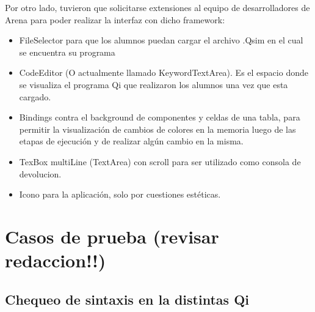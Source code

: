 Por otro lado, tuvieron que solicitarse extensiones al equipo de desarrolladores de Arena para poder realizar la interfaz con dicho framework:

\begin{itemize}
\item FileSelector para que los alumnos puedan cargar el archivo .Qsim en el cual se encuentra su programa
\item CodeEditor (O actualmente llamado KeywordTextArea). Es el espacio donde se visualiza el programa Qi que realizaron los alumnos una vez que esta cargado.
\item Bindings contra el background de componentes y celdas de una tabla, para permitir la visualización de cambios de colores en la memoria luego de las etapas de ejecución y de realizar algún cambio en la misma.
\item TexBox multiLine (TextArea) con scroll para ser utilizado como consola de devolucion.
\item Icono para la aplicación, solo por cuestiones estéticas.
\end{itemize}

\section{Casos de prueba (revisar redaccion!!)}


\subsection{Chequeo de sintaxis en la distintas Qi}

